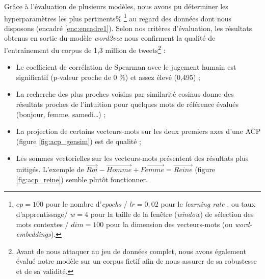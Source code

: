 \documentclass[10pt,french,french]{article}
\let\rmarkdownfootnote\footnote%
\def\footnote{\protect\rmarkdownfootnote}
\begin{document}
Grâce à l'évaluation de plusieurs modèles, nous avons pu déterminer les
hyperparamètres les plus pertinents\% \footnote{
$ep = 100$ pour le nombre d'\og \emph{epochs} \fg / $lr = 0,02$ pour le \og \emph{learning rate} \fg, ou taux d'apprentissage/ $w = 4$ pour la taille de la fenêtre (\emph{window}) de sélection des mots contextes / $dim = 100$ pour la dimension des vecteurs-mots (ou \emph{word-embeddings}).
} au regard des données dont nous disposons (encadré
\ref{enc:encadre1}). Selon nos critères d'évaluation, les résultats
obtenus en sortie du modèle \emph{word2vec} nous confirment la qualité
de l'entraînement du corpus de 1,3 million de tweets\footnote{Avant de
  nous attaquer au jeu de données complet, nous avons également évalué
  notre modèle sur un corpus fictif afin de nous assurer de sa
  robustesse et de sa validité.} :

\begin{itemize}
\item Le coefficient de corrélation de Spearman avec le jugement humain est significatif (p-valeur proche de 0 \%) et assez élevé (0,495) ;
\item La recherche des plus proches voisins par similarité cosinus donne des résultats proches de l'intuition pour quelques mots de référence évalués (bonjour, femme, samedi\dots) ;
\item La projection de certains vecteurs-mots sur les deux premiers axes d'une ACP (figure \ref{fig:acp_gensim}) est de qualité ;
\item Les sommes vectorielles sur les vecteurs-mots présentent des résultats plus mitigés. L'exemple de  $\overrightarrow{Roi} - \overrightarrow{Homme} + \overrightarrow{Femme} = \overrightarrow{Reine}$ (figure \ref{fig:acp_reine}) semble plutôt fonctionner. 
\end{itemize}
\end{document}

